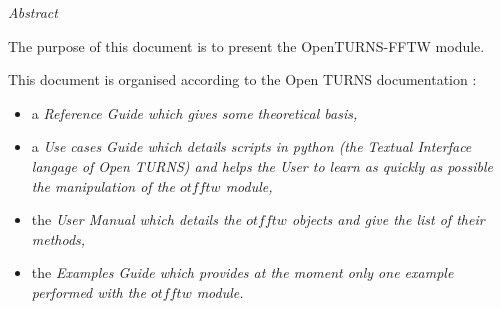 %  
\vspace{0.5in}
\begin{center}
\vspace{0.3in}
\emph{ Abstract}
\vspace{0.5in}
\end{center}

The purpose of this document is to present the OpenTURNS-FFTW module.

This document is organised according to the Open TURNS documentation :
\begin{itemize}
\item a \itshape{Reference Guide} which gives some theoretical basis,
\item a \itshape{Use cases Guide} which details scripts in python (the Textual Interface langage of Open TURNS) and helps the User to learn as quickly as possible the manipulation of the $otfftw$ module,
\item the \itshape{User Manual} which details the $otfftw$ objects and give the list of their methods,
\item the \itshape{Examples Guide} which provides at the moment only one example performed with the $otfftw$ module.
\end{itemize}

